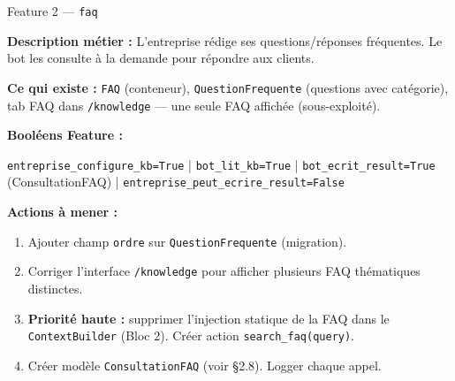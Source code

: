 \documentclass[11pt,a4paper]{article}
\newcommand{\slug}[1]{\texttt{\color{AGTDark}#1}}
\newcommand{\prio}[1]{\textcolor{AGTRed}{\textbf{#1}}}
\begin{document}
\begin{featurebox}{Feature 2 — \slug{faq}}

\textbf{Description métier :} L'entreprise rédige ses questions/réponses
fréquentes. Le bot les consulte à la demande pour répondre aux clients.

\textbf{Ce qui existe :} \slug{FAQ} (conteneur), \slug{QuestionFrequente}
(questions avec catégorie), tab FAQ dans \texttt{/knowledge} — une seule FAQ
affichée (sous-exploité).

\medskip
\textbf{Booléens Feature :}
\begin{decisionbox}
\texttt{entreprise\_configure\_kb=True} | \texttt{bot\_lit\_kb=True} |
\texttt{bot\_ecrit\_result=True} (ConsultationFAQ) | \texttt{entreprise\_peut\_ecrire\_result=False}
\end{decisionbox}

\medskip
\textbf{Actions à mener :}
\begin{enumerate}
  \item Ajouter champ \slug{ordre} sur \slug{QuestionFrequente} (migration).
  \item Corriger l'interface \texttt{/knowledge} pour afficher plusieurs FAQ
        thématiques distinctes.
  \item \prio{Priorité haute :} supprimer l'injection statique de la FAQ dans le
        \slug{ContextBuilder} (Bloc 2). Créer action \slug{search\_faq(query)}.
  \item Créer modèle \slug{ConsultationFAQ} (voir §2.8). Logger chaque appel.
\end{enumerate}

\end{featurebox}

\bigskip
\end{document}
